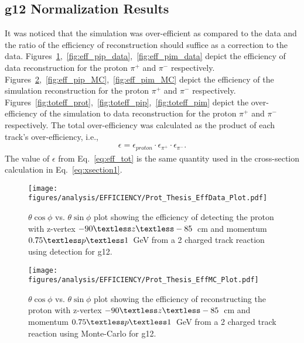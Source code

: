 \subsection{g12 Normalization Results}
It was noticed that the simulation was over-efficient as compared to the data and the ratio of the efficiency of reconstruction should suffice as a correction to the data. Figures~\ref{fig:eff_prot_data},~\ref{fig:eff_pip_data},~\ref{fig:eff_pim_data} depict the efficiency of data reconstruction for the proton $\pi^+$ and $\pi^-$ respectively. Figures~\ref{fig:eff_prot_MC},~\ref{fig:eff_pip_MC},~\ref{fig:eff_pim_MC} depict the efficiency of the simulation reconstruction for the proton $\pi^+$ and $\pi^-$ respectively. Figures~\ref{fig:toteff_prot},~\ref{fig:toteff_pip},~\ref{fig:toteff_pim} depict the over-efficiency of the simulation to data reconstruction for the proton $\pi^+$ and $\pi^-$ respectively.
The total over-efficiency was calculated as the product of each track's over-efficiency, i.e.,
\begin{align}\label{eq:eff_tot}
\epsilon = \epsilon_{proton}\cdot\epsilon_{\pi^+}\cdot\epsilon_{\pi^-}.
\end{align}
The value of $\epsilon$ from Eq.~\ref{eq:eff_tot} is the same quantity used in the cross-section calculation in Eq.~\ref{eq:xsection1}.
\begin{figure}[h!]\begin{center}
		\texttt{[image: \\figures/analysis/EFFICIENCY/Prot\_Thesis\_EffData\_Plot.pdf]}
		\caption[$\theta \cos\phi$ vs. $\theta \sin\phi$ plot showing the efficiency of detecting the proton with z-vertex $-90\textless z\textless-85$~cm and momentum $0.75\textless p \textless 1$~GeV from a 2 charged track reaction using  detection for g12]{\label{fig:eff_prot_data} $\theta \cos\phi$ vs. $\theta \sin\phi$ plot showing the efficiency of detecting the proton with z-vertex $-90\textless z\textless-85$~cm and momentum $0.75\textless p \textless 1$~GeV from a 2 charged track reaction using  detection for g12.}
\end{center}\end{figure}
\begin{figure}[h!]\begin{center}
		\texttt{[image: \\figures/analysis/EFFICIENCY/Prot\_Thesis\_EffMC\_Plot.pdf]}
		\caption[$\theta \cos\phi$ vs. $\theta \sin\phi$ plot showing the efficiency of reconstructing the proton with z-vertex $-90\textless z\textless-85$~cm and momentum $0.75\textless p \textless 1$~GeV from a 2 charged track reaction using  Monte-Carlo for g12]{\label{fig:eff_prot_MC} $\theta \cos\phi$ vs. $\theta \sin\phi$ plot showing the efficiency of reconstructing the proton with z-vertex $-90\textless z\textless-85$~cm and momentum $0.75\textless p \textless 1$~GeV from a 2 charged track reaction using  Monte-Carlo for g12.}
\end{center}\end{figure}
